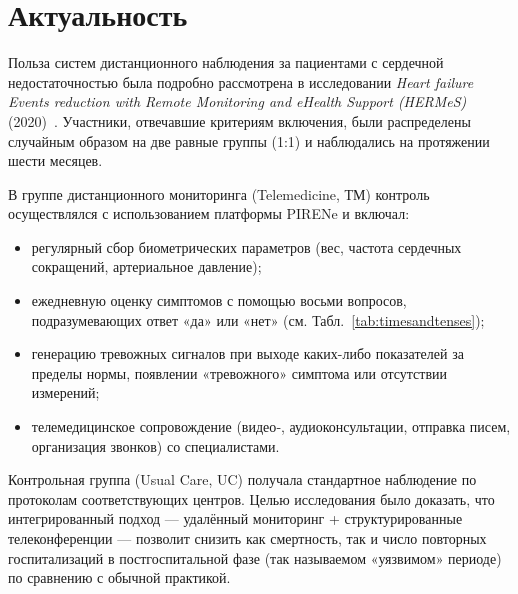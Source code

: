 \chapter{Актуальность}\label{sec:}

Польза систем дистанционного наблюдения за пациентами с сердечной недостаточностью была подробно рассмотрена в исследовании \textit{Heart failure Events reduction with Remote Monitoring and eHealth Support (HERMeS)} (2020)~\cite{hermes2020}.
Участники, отвечавшие критериям включения, были распределены случайным образом на две равные группы (1:1) и наблюдались на протяжении шести месяцев.

В группе дистанционного мониторинга (Telemedicine, ТМ) контроль осуществлялся с использованием платформы PIRENe и включал:
\begin{itemize}
    \item регулярный сбор биометрических параметров (вес, частота сердечных сокращений, артериальное давление);
    \item ежедневную оценку симптомов с помощью восьми вопросов, подразумевающих ответ «да» или «нет» (см. Табл.~\ref{tab:timesandtenses});
    \item генерацию тревожных сигналов при выходе каких-либо показателей за пределы нормы, появлении «тревожного» симптома или отсутствии измерений;
    \item телемедицинское сопровождение (видео‑, аудиоконсультации, отправка писем, организация звонков) со специалистами.
\end{itemize}

Контрольная группа (Usual Care, UC) получала стандартное наблюдение по протоколам соответствующих центров.
Целью исследования было доказать, что интегрированный подход — удалённый мониторинг + структурированные телеконференции — позволит снизить как смертность, так и число повторных госпитализаций в постгоспитальной фазе (так называемом «уязвимом» периоде) по сравнению с обычной практикой.

